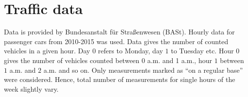 \documentclass[a4paper,10pt]{article}
\begin{document}
\section{Traffic data}
Data is provided by Bundesanstalt für Straßenwesen (BASt).
Hourly data for passenger cars from 2010-2015 was used.
Data gives the number of counted vehicles in a given hour.
Day $0$ refers to Monday, day $1$ to Tuesday etc.
Hour $0$ gives the number of vehicles counted between 0 a.m. and 1 a.m., hour $1$ between $1$ a.m. and $2$ a.m. and so on.
Only measurements marked as ``on a regular base'' were considered.
Hence, total number of measurements for single hours of the week slightly vary.
\end{document}
